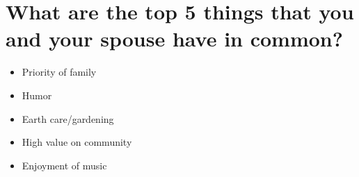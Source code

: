 \section{What are the top 5 things that you and your spouse have in common?}
\begin{itemize}
\item{Priority of family}
\item{Humor}
\item{Earth care/gardening}
\item{High value on community}
\item{Enjoyment of music}
\end{itemize}
